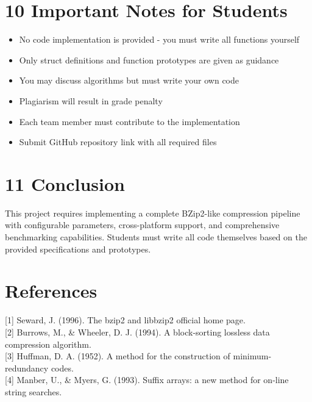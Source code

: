 \documentclass[10pt]{article}
\begin{document}
\section*{10 Important Notes for Students}
\begin{itemize}
  \item No code implementation is provided - you must write all functions yourself
  \item Only struct definitions and function prototypes are given as guidance
  \item You may discuss algorithms but must write your own code
  \item Plagiarism will result in grade penalty
  \item Each team member must contribute to the implementation
  \item Submit GitHub repository link with all required files
\end{itemize}

\section*{11 Conclusion}
This project requires implementing a complete BZip2-like compression pipeline with configurable parameters, cross-platform support, and comprehensive benchmarking capabilities. Students must write all code themselves based on the provided specifications and prototypes.

\section*{References}
[1] Seward, J. (1996). The bzip2 and libbzip2 official home page.\\[0pt]
[2] Burrows, M., \& Wheeler, D. J. (1994). A block-sorting lossless data compression algorithm.\\[0pt]
[3] Huffman, D. A. (1952). A method for the construction of minimum-redundancy codes.\\[0pt]
[4] Manber, U., \& Myers, G. (1993). Suffix arrays: a new method for on-line string searches.
\end{document}
